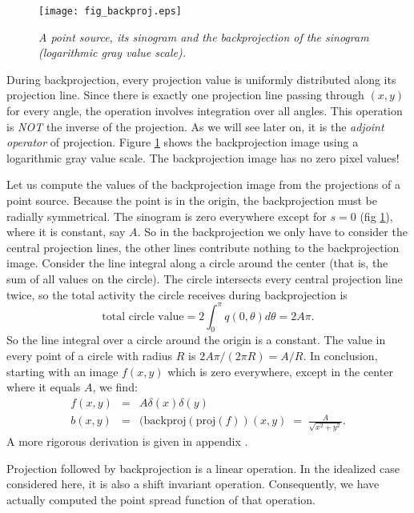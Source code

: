 \begin{figure}[tb]
\centering
\texttt{[image: fig\_backproj.eps]}
\caption{\label{fig:backproj} \emph{A point source, its sinogram and the
backprojection of the sinogram (logarithmic gray value scale).}}
\end{figure}

During backprojection, every projection value is uniformly distributed
along its projection line. Since there is exactly one projection line
passing through $(x,y)$ for every angle, the operation involves
integration over all angles. This operation is {\em NOT} the inverse
of the projection. As we will see later on, it is the {\em adjoint
operator} of projection. Figure \ref{fig:backproj} shows the
backprojection image using a logarithmic gray value scale. The
backprojection image has no zero pixel values!

Let us compute the values of the backprojection image from the
projections of a point source. Because the point is in the origin, the
backprojection must be radially symmetrical. The sinogram is zero
everywhere except for $s = 0$ (fig \ref{fig:backproj}), where it is
constant, say $A$. So in the backprojection we only have to consider the
central projection lines, the other lines contribute nothing to the
backprojection image.  Consider the line integral along a circle
around the center (that is, the sum of all values on the circle). The
circle intersects every central projection line twice, so the total
activity the circle receives during backprojection is
\begin{equation}
  \mbox{total circle value} = 2 \int_0^\pi q(0, \theta) d \theta = 2 A\pi.
  \label{eq:bprojvalue}
\end{equation}
So the line integral over a circle around the origin is a constant. The value
in every point of a circle with radius $R$ is $2 A \pi / (2 \pi R) =
A/R$. In conclusion, starting with an image $f(x,y)$ which is zero everywhere,
except in the center where it equals $A$, we find:
\begin{eqnarray}
  f(x,y) & = & A \delta(x) \delta(y)\\
 b(x,y) & = & (\mbox{backproj}(\mbox{proj}(f))(x,y) \; = \;
  \frac{A}{\sqrt{x^2 + y^2}}.
\end{eqnarray}
A more rigorous derivation is given in appendix .

Projection followed by backprojection is a linear operation. In the
idealized case considered here, it is also a shift invariant
operation. Consequently, we have actually computed the point spread function
of that operation.

